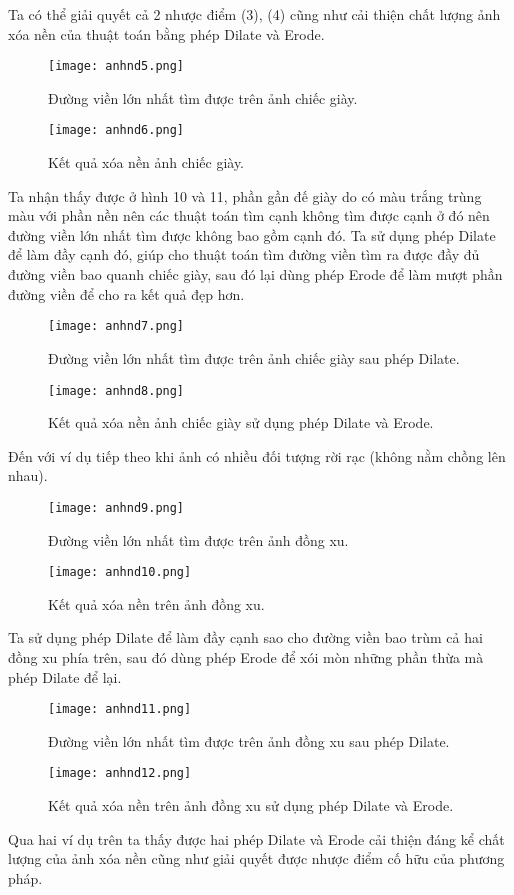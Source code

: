 \documentclass[conference]{IEEEtran}
\begin{document}
 Ta có thể giải quyết cả 2 nhược điểm (3), (4) cũng như cải thiện chất lượng ảnh xóa nền của thuật toán bằng phép Dilate và Erode.
  \begin{figure}[!htb]
\centerline{\texttt{[image: anhnd5.png]}}
\caption{Đường viền lớn nhất tìm được trên ảnh chiếc giày.}
\label{fig}
\end{figure}
 \FloatBarrier
   \begin{figure}[!htb]
\centerline{\texttt{[image: anhnd6.png]}}
\caption{Kết quả xóa nền ảnh chiếc giày.}
\label{fig}
\end{figure}
 \FloatBarrier
Ta nhận thấy được ở hình 10 và 11, phần gần đế giày do có màu trắng trùng màu với phần nền nên các thuật toán tìm cạnh không tìm được cạnh ở đó nên đường viền lớn nhất tìm được không bao gồm cạnh đó. Ta sử dụng phép Dilate để làm đầy cạnh đó, giúp cho thuật toán tìm đường viền tìm ra được đầy đủ đường viền bao quanh chiếc giày, sau đó lại dùng phép Erode để làm mượt phần đường viền để cho ra kết quả đẹp hơn.

 \begin{figure}[!htb]
\centerline{\texttt{[image: anhnd7.png]}}
\caption{Đường viền lớn nhất tìm được trên ảnh chiếc giày sau phép Dilate.}
\label{fig}
\end{figure}
 \FloatBarrier
   \begin{figure}[!htb]
\centerline{\texttt{[image: anhnd8.png]}}
\caption{Kết quả xóa nền ảnh chiếc giày sử dụng phép Dilate và Erode.}
\label{fig}
\end{figure}
 \FloatBarrier
 Đến với ví dụ tiếp theo khi ảnh có nhiều đối tượng rời rạc (không nằm chồng lên nhau).
 \begin{figure}[!htb]
\centerline{\texttt{[image: anhnd9.png]}}
\caption{Đường viền lớn nhất tìm được trên ảnh đồng xu.}
\label{fig}
\end{figure}
 \FloatBarrier
  \begin{figure}[!htb]
\centerline{\texttt{[image: anhnd10.png]}}
\caption{Kết quả xóa nền trên ảnh đồng xu.}
\label{fig}
\end{figure}
 \FloatBarrier
 Ta sử dụng phép Dilate để làm đầy cạnh sao cho đường viền bao trùm cả hai đồng xu phía trên, sau đó dùng phép Erode để xói mòn những phần thừa mà phép Dilate để lại.
 \begin{figure}[!htb]
\centerline{\texttt{[image: anhnd11.png]}}
\caption{Đường viền lớn nhất tìm được trên ảnh đồng xu sau phép Dilate.}
\label{fig}
\end{figure}
 \FloatBarrier
  \begin{figure}[!htb]
\centerline{\texttt{[image: anhnd12.png]}}
\caption{Kết quả xóa nền trên ảnh đồng xu sử dụng phép Dilate và Erode.}
\label{fig}
\end{figure}
 \FloatBarrier
 Qua hai ví dụ trên ta thấy được hai phép Dilate và Erode cải thiện đáng kể chất lượng của ảnh xóa nền cũng như giải quyết được nhược điểm cố hữu của phương pháp.
\end{document}
